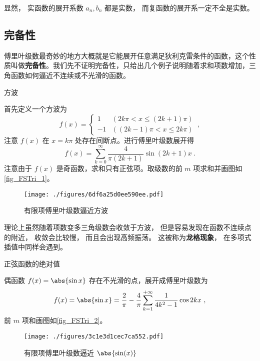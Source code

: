 显然， 实函数的展开系数 $a_n, b_n$ 都是实数， 而复函数的展开系一定不全是实数。

\subsection{完备性}
傅里叶级数最奇妙的地方大概就是它能展开任意满足狄利克雷条件的函数，这个性质叫做\textbf{完备性}。我们先不证明完备性，只给出几个例子说明随着求和项数增加，三角函数如何逼近不连续或不光滑的函数。

\begin{example}{方波}\label{ex_FSTri_1}

首先定义一个方波为
\begin{equation}\label{eq_FSTri_7}
f(x) = 
\begin{cases}
1  & (2k\pi < x \leqslant (2k + 1)\pi) \\
- 1 &  ((2k - 1)\pi < x \leqslant 2k\pi)
\end{cases}~,
\end{equation}
注意 $f(x)$ 在 $x=k\pi$ 处存在间断点。进行傅里叶级数展开得
\begin{equation}\label{eq_FSTri_5}
f(x) = \sum_{k = 0}^\infty \frac{4}{\pi (2k + 1)}\sin (2k + 1)x~.
\end{equation}
注意由于 $f(x)$ 是奇函数，求和只有正弦项。取级数的前 $m$ 项求和并画图如\autoref{fig_FSTri_1}。

\begin{figure}[ht]
\centering
\texttt{[image: ./figures/6df6a25d0ee590ee.pdf]}
\caption{有限项傅里叶级数逼近方波}\label{fig_FSTri_1}
\end{figure}
理论上虽然随着项数变多三角级数会收敛于方波， 但是容易发现在函数不连续点的附近， 收敛会比较慢， 而且会出现高频振荡。 这被称为\textbf{龙格现象}， 在多项式插值中同样会遇到。
\end{example}

\begin{example}{正弦函数的绝对值}

偶函数 $f(x) = \abs{\sin x}$ 存在不光滑的点，展开成傅里叶级数为
\begin{equation}\label{eq_FSTri_6}
f(x) = \abs{\sin x} = \frac{2}{\pi } - \frac{4}{\pi }\sum_{k = 1}^{+\infty} \frac{1}{4 k^2 - 1}\cos 2k x~,
\end{equation}
前 $m$ 项和画图如\autoref{fig_FSTri_2}。
\begin{figure}[ht]
\centering
\texttt{[image: ./figures/3c1e3d1cec7ca552.pdf]}
\caption{有限项傅里叶级数逼近 $\abs{\sin(x)}$}\label{fig_FSTri_2}
\end{figure}
\end{example}

